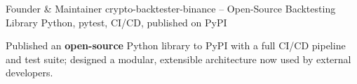

\begin{cventries}

  \cventry
    {Founder \& Maintainer} %
    {crypto-backtester-binance -- Open-Source Backtesting Library} %
    {Python, pytest, CI/CD, published on PyPI} %
    {} %
    {
      \begin{cvitems}
        \item {Published an \textbf{open-source} Python library to PyPI with a full CI/CD pipeline and test suite; designed a modular, extensible architecture now used by external developers.}
      \end{cvitems}
    }

\end{cventries}
